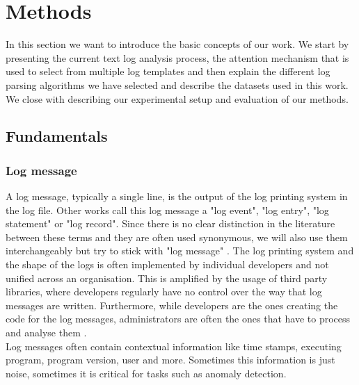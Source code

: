 \chapter{Methods}
\label{ch:Methods}
In this section we want to introduce the basic concepts of our work. We start by presenting the current text log analysis process, the attention mechanism that is used to select from multiple log templates and then explain the different log parsing algorithms we have selected and describe the datasets used in this work. We close with describing our experimental setup and evaluation of our methods.  


\section{Fundamentals}
\label{sec:Methods:Fundamentals}

\subsection{Log message}
\label{sec:Methods:Fundamentals:Message}

A log message, typically a single line, is the output of the log printing system in the log file. Other works call this log message a "log event", "log entry", "log statement" or "log record". Since there is no clear distinction in the literature between these terms and they are often used synonymous,  we will also use them interchangeably but try to stick with "log message" \cite{gholamian2022comprehensive}. The log printing system and the shape of the logs is often implemented by individual developers and not unified across an organisation. This is amplified by the usage of third party libraries, where developers regularly have no control over the way that log messages are written. Furthermore, while developers are the ones creating the code for the log messages, administrators are often the ones that have to process and analyse them \cite{gholamian2022comprehensive}.\\


Log messages often contain contextual information like time stamps, executing program, program version, user and more. Sometimes this information is just noise, sometimes it is critical for tasks such as anomaly detection. 


